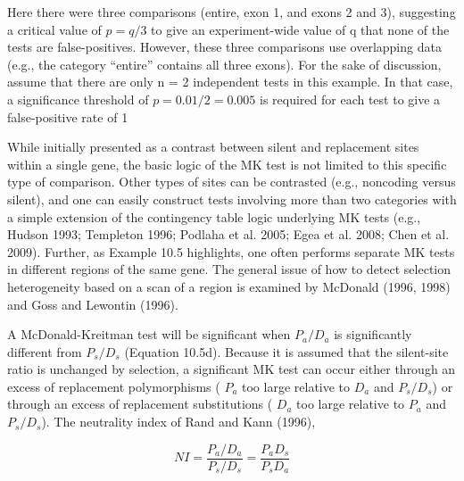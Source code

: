 \documentclass{article}
\begin{document}
Here there were three comparisons (entire, exon 1, and exons 2 and 3), suggesting a critical value of  $ p = q/3 $ to give an experiment-wide value of q that none of the tests are false-positives. However, these three comparisons use overlapping data (e.g., the category “entire” contains all three exons). For the sake of discussion, assume that there are only n = 2 independent tests in this example. In that case, a significance threshold of  $ p = 0.01/2 = 0.005 $ is required for each test to give a false-positive rate of 1%

While initially presented as a contrast between silent and replacement sites within a single gene, the basic logic of the MK test is not limited to this specific type of comparison. Other types of sites can be contrasted (e.g., noncoding versus silent), and one can easily construct tests involving more than two categories with a simple extension of the contingency table logic underlying MK tests (e.g., Hudson 1993; Templeton 1996; Podlaha et al. 2005; Egea et al. 2008; Chen et al. 2009). Further, as Example 10.5 highlights, one often performs separate MK tests in different regions of the same gene. The general issue of how to detect selection heterogeneity based on a scan of a region is examined by McDonald (1996, 1998) and Goss and Lewontin (1996).

A McDonald-Kreitman test will be significant when  $ P_a/D_a $ is significantly different from  $ P_s/D_s $ (Equation 10.5d). Because it is assumed that the silent-site ratio is unchanged by selection, a significant MK test can occur either through an excess of replacement polymorphisms ( $ P_a $ too large relative to  $ D_a $ and  $ P_s/D_s $) or through an excess of replacement substitutions ( $ D_a $ too large relative to  $ P_a $ and  $ P_s/D_s $). The neutrality index of Rand and Kann (1996),

\begin{equation}
NI=\frac{P_{a}/D_{a}}{P_{s}/D_{s}}=\frac{P_{a}D_{s}}{P_{s}D_{a}}
\tag{10.6a}
\label{eq:10_6a}
\end{equation}
\end{document}
